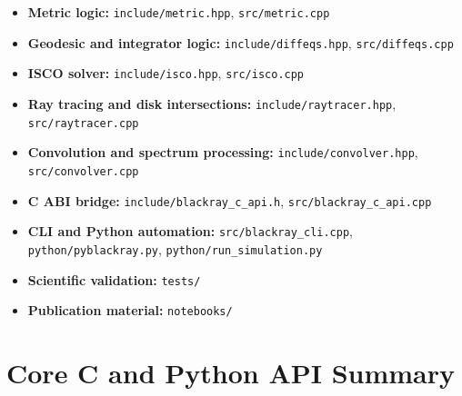\documentclass[11pt]{article}
\begin{document}
\begin{itemize}[leftmargin=1.5em]
    \item \textbf{Metric logic:} \texttt{include/metric.hpp}, \texttt{src/metric.cpp}
    \item \textbf{Geodesic and integrator logic:} \texttt{include/diffeqs.hpp}, \texttt{src/diffeqs.cpp}
    \item \textbf{ISCO solver:} \texttt{include/isco.hpp}, \texttt{src/isco.cpp}
    \item \textbf{Ray tracing and disk intersections:} \texttt{include/raytracer.hpp}, \texttt{src/raytracer.cpp}
    \item \textbf{Convolution and spectrum processing:} \texttt{include/convolver.hpp}, \texttt{src/convolver.cpp}
    \item \textbf{C ABI bridge:} \texttt{include/blackray_c_api.h}, \texttt{src/blackray_c_api.cpp}
    \item \textbf{CLI and Python automation:} \texttt{src/blackray_cli.cpp}, \texttt{python/pyblackray.py}, \texttt{python/run_simulation.py}
    \item \textbf{Scientific validation:} \texttt{tests/}
    \item \textbf{Publication material:} \texttt{notebooks/}
\end{itemize}

\section{Core C and Python API Summary}
\end{document}
